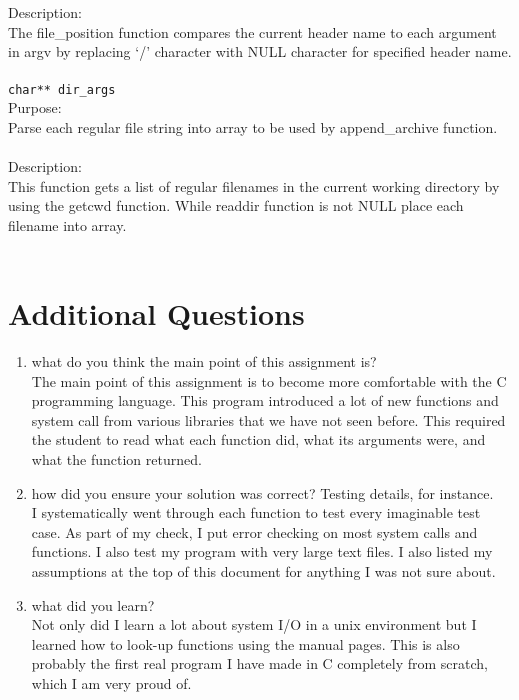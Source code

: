 \documentclass[12pt,letterpaper]{article}
\begin{document}
\\\\
Description:
\\
The file\_position function compares the current header name to each argument in argv by replacing ‘/’ character with NULL character for specified header name. 
\\\\
\texttt{char** dir\_args}
\\
Purpose:
\\
Parse each regular file string into array to be used by append\_archive function.
\\\\
Description:
\\
This function gets a list of regular filenames in the current working directory by using the getcwd function. While readdir function is not NULL place each filename into array. 
\\\\

\section{Additional Questions}
\begin{enumerate}
    \item
    what do you think the main point of this assignment is?
\\
The main point of this assignment is to become more comfortable with the C programming language. This program introduced a lot of new functions and system call from various libraries that we have not seen before. This required the student to read what each function did, what its arguments were, and what the function returned.

    \item
    how did you ensure your solution was correct? Testing details, for instance.
\\
I systematically went through each function to test every imaginable test case. As part of my check, I put error checking on most system calls and functions. I also test my program with very large text files. I also listed my assumptions at the top of this document for anything I was not sure about.
    
    \item
    what did you learn?
\\
Not only did I learn a lot about system I/O in a unix environment but I learned how to look-up functions using the manual pages. This is also probably the first real program I have made in C completely from scratch, which I am very proud of.
    
\end{enumerate}
\end{document}
